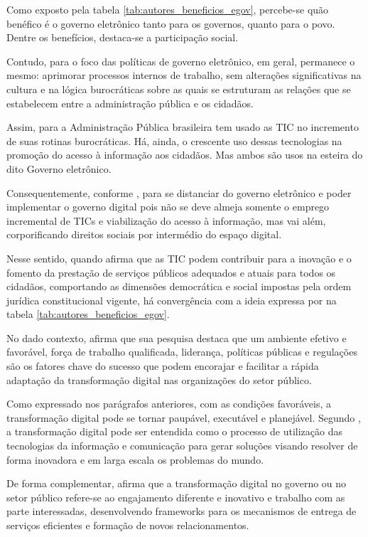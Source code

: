 Como exposto pela tabela \ref{tab:autores_beneficios_egov}, percebe-se quão benéfico é o governo eletrônico tanto para os governos, quanto para o povo. Dentre os benefícios, destaca-se a participação social.

Contudo, para \cite{de2020governo} o foco das políticas de governo eletrônico, em geral, permanece o mesmo: aprimorar processos internos de  trabalho, sem alterações significativas na cultura e na lógica burocráticas sobre as quais se estruturam as relações que se estabelecem entre a administração pública e os cidadãos.

Assim, para \cite{cristovam2020governo} a Administração Pública brasileira tem usado as TIC no incremento de suas rotinas burocráticas. Há, ainda, o crescente uso dessas tecnologias na promoção do acesso à informação aos cidadãos. Mas ambos são usos na esteira do dito Governo eletrônico.

Consequentemente, conforme \cite{cristovam2020governo}, para se distanciar do governo eletrônico e poder implementar o governo digital pois não se deve almeja somente o emprego incremental de TICs e viabilização do acesso à informação, mas vai além, corporificando direitos sociais por intermédio do espaço digital.

Nesse sentido, quando \cite{cristovam2020governo} afirma que as TIC podem contribuir para a inovação e o fomento da prestação de serviços públicos adequados e atuais para todos os cidadãos, comportando as dimensões democrática e social impostas pela ordem jurídica constitucional vigente, há convergência com a ideia expressa por \cite{kotenok2020government} na tabela \ref{tab:autores_beneficios_egov}.

No dado contexto, \cite{alenezi2022understanding} afirma que sua pesquisa destaca que um ambiente efetivo e favorável, força de trabalho qualificada, liderança, políticas públicas e regulações são os fatores chave do sucesso que podem encorajar e facilitar a rápida adaptação da transformação digital nas organizações do setor público.

Como expressado nos parágrafos anteriores, com as condições favoráveis, a transformação digital pode se tornar paupável, executável e planejável. Segundo \cite{mitkiewicz2024transformacao}, a transformação digital pode ser entendida como o processo de utilização das tecnologias da informação e comunicação para gerar soluções visando resolver de forma inovadora e em larga escala os problemas do mundo.

De forma complementar, \cite{alenezi2022understanding} afirma que a transformação digital no governo ou no setor público refere-se ao engajamento diferente e inovativo e trabalho com as parte interessadas, desenvolvendo frameworks para os mecanismos de entrega de serviços eficientes e formação de novos relacionamentos.

